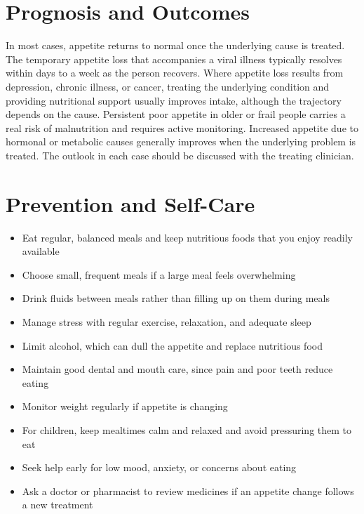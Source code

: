 \section*{Prognosis and Outcomes}
In most cases, appetite returns to normal once the underlying cause is treated. The temporary appetite loss that accompanies a viral illness typically resolves within days to a week as the person recovers. Where appetite loss results from depression, chronic illness, or cancer, treating the underlying condition and providing nutritional support usually improves intake, although the trajectory depends on the cause. Persistent poor appetite in older or frail people carries a real risk of malnutrition and requires active monitoring. Increased appetite due to hormonal or metabolic causes generally improves when the underlying problem is treated. The outlook in each case should be discussed with the treating clinician.

\section*{Prevention and Self-Care}
\begin{itemize}
    \item Eat regular, balanced meals and keep nutritious foods that you enjoy readily available
    \item Choose small, frequent meals if a large meal feels overwhelming
    \item Drink fluids between meals rather than filling up on them during meals
    \item Manage stress with regular exercise, relaxation, and adequate sleep
    \item Limit alcohol, which can dull the appetite and replace nutritious food
    \item Maintain good dental and mouth care, since pain and poor teeth reduce eating
    \item Monitor weight regularly if appetite is changing
    \item For children, keep mealtimes calm and relaxed and avoid pressuring them to eat
    \item Seek help early for low mood, anxiety, or concerns about eating
    \item Ask a doctor or pharmacist to review medicines if an appetite change follows a new treatment
\end{itemize}

